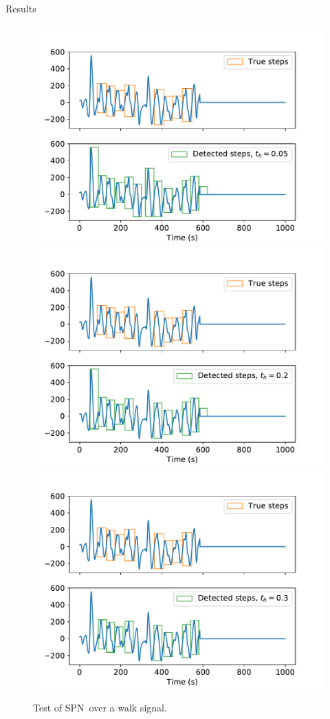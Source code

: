\documentclass[9pt,t,aspectratio=1610]{beamer}
\newcommand{\subalgo}{{\small\textsc{SPN}}\ }
\begin{document}
\begin{frame}{Results}
\begin{figure}[h]
    \begin{overprint}
        \centering\includegraphics[width=0.75\linewidth]{Mercredi_10_19_13_00_to_10_19_18_85_th_005.pdf}
        \centering\includegraphics[width=0.75\linewidth]{Mercredi_10_19_13_00_to_10_19_18_85_th_02.pdf}
        \centering\includegraphics[width=0.75\linewidth]{Mercredi_10_19_13_00_to_10_19_18_85_th_03.pdf}
    \end{overprint}
    \caption{Test of \subalgo over a walk signal.}
\end{figure}
\end{frame}
\end{document}

